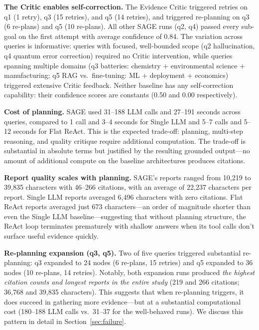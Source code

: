 \documentclass[11pt]{article}
\begin{document}
\textbf{The Critic enables self-correction.} The Evidence Critic triggered retries on q1 (1 retry), q3 (15 retries), and q5 (14 retries), and triggered re-planning on q3 (6 re-plans) and q5 (10 re-plans). All other SAGE runs (q2, q4) passed every sub-goal on the first attempt with average confidence of 0.84. The variation across queries is informative: queries with focused, well-bounded scope (q2 hallucination, q4 quantum error correction) required no Critic intervention, while queries spanning multiple domains (q3 batteries: chemistry $+$ environmental science $+$ manufacturing; q5 RAG vs.\ fine-tuning: ML $+$ deployment $+$ economics) triggered extensive Critic feedback. Neither baseline has any self-correction capability: their confidence scores are constants (0.50 and 0.00 respectively).

\textbf{Cost of planning.} SAGE used 31--188 LLM calls and 27--191 seconds across queries, compared to 1 call and 3--4 seconds for Single LLM and 5--7 calls and 5--12 seconds for Flat ReAct. This is the expected trade-off: planning, multi-step reasoning, and quality critique require additional computation. The trade-off is substantial in absolute terms but justified by the resulting grounded output---no amount of additional compute on the baseline architectures produces citations.

\textbf{Report quality scales with planning.} SAGE's reports ranged from 10{,}219 to 39{,}835 characters with 46--266 citations, with an average of 22{,}237 characters per report. Single LLM reports averaged 6{,}496 characters with zero citations. Flat ReAct reports averaged just 673 characters---an order of magnitude shorter than even the Single LLM baseline---suggesting that without planning structure, the ReAct loop terminates prematurely with shallow answers when its tool calls don't surface useful evidence quickly.

\textbf{Re-planning expansion (q3, q5).} Two of five queries triggered substantial re-planning: q3 expanded to 24 nodes (6 re-plans, 15 retries) and q5 expanded to 36 nodes (10 re-plans, 14 retries). Notably, both expansion runs produced \emph{the highest citation counts and longest reports in the entire study} (219 and 266 citations; 36{,}768 and 39{,}835 characters). This suggests that when re-planning triggers, it does succeed in gathering more evidence---but at a substantial computational cost (180--188 LLM calls vs.\ 31--37 for the well-behaved runs). We discuss this pattern in detail in Section~\ref{sec:failure}.
\end{document}
